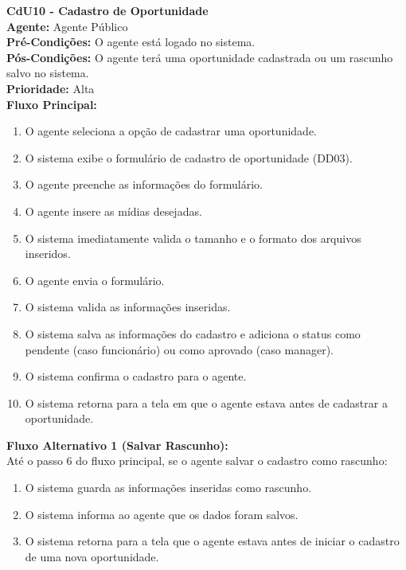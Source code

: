 
\vspace{7pt}
\noindent\textbf{\normalsize CdU10 - Cadastro de Oportunidade}\\
\noindent\textbf{Agente:} Agente Público\\ 
\textbf{Pré-Condições:} O agente está logado no sistema.\\ 
\textbf{Pós-Condições:} O agente terá uma oportunidade cadastrada ou um rascunho salvo no sistema.\\
\textbf{Prioridade:} Alta \vspace{3pt}\\
\noindent\textbf{Fluxo Principal:}
\begin{enumerate}[noitemsep, topsep=-5pt, parsep=0pt]
    \item O agente seleciona a opção de cadastrar uma oportunidade.
    \item O sistema exibe o formulário de cadastro de oportunidade (DD03).
    \item O agente preenche as informações do formulário.
    \item O agente insere as mídias desejadas.
    \item O sistema imediatamente valida o tamanho e o formato dos arquivos inseridos.
    \item O agente envia o formulário.
    \item O sistema valida as informações inseridas.
    \item O sistema salva as informações do cadastro e adiciona o status como pendente (caso funcionário) ou como aprovado (caso manager).
    \item O sistema confirma o cadastro para o agente.
    \item O sistema retorna para a tela em que o agente estava antes de cadastrar a oportunidade.
\end{enumerate}

\noindent\textbf{Fluxo Alternativo 1 (Salvar Rascunho):}\\
Até o passo 6 do fluxo principal, se o agente salvar o cadastro como rascunho:
\begin{enumerate}[noitemsep, topsep=-5pt, parsep=0pt]
    \item O sistema guarda as informações inseridas como rascunho.
    \item O sistema informa ao agente que os dados foram salvos.
    \item O sistema retorna para a tela que o agente estava antes de iniciar o cadastro de uma nova oportunidade.
\end{enumerate}

